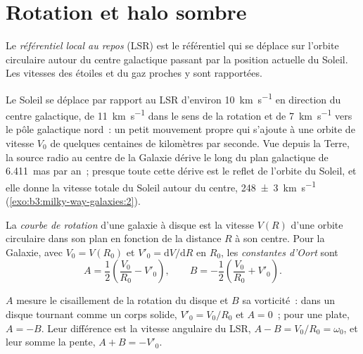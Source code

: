 \section{Rotation et halo sombre}\label{sec:b3:milky-way-galaxies:rotation}

\begin{definition}\label{def:b3:milky-way-galaxies:lsr}
Le \emph{référentiel local au repos} (LSR) est
le référentiel qui se déplace sur l'orbite circulaire autour du centre galactique
passant par la position actuelle du Soleil. Les vitesses des étoiles et du gaz
proches y sont rapportées.
\end{definition}

Le Soleil se déplace par rapport au LSR d'environ \qty{10}{km.s^{-1}} en direction du
centre galactique, de \qty{11}{km.s^{-1}} dans le sens de la rotation et de
\qty{7}{km.s^{-1}} vers le pôle galactique nord~: un petit mouvement propre
qui s'ajoute à une orbite de vitesse $V_0$ de quelques centaines de kilomètres
par seconde. Vue depuis la Terre, la source radio au centre de la Galaxie dérive
le long du plan galactique de \qty{6.411}{mas} par an~; presque toute cette
dérive est le reflet de l'orbite du Soleil, et elle donne la vitesse totale du
Soleil autour du centre, \qty[separate-uncertainty=true]{248 \pm 3}{km.s^{-1}}
(\cref{exo:b3:milky-way-galaxies:2}).

\begin{definition}\label{def:b3:milky-way-galaxies:rotation-curve}
La \emph{courbe de rotation} d'une galaxie à disque est la
vitesse $V(R)$ d'une orbite circulaire dans son plan en fonction de la
distance $R$ à son centre. Pour la Galaxie, avec $V_0 = V(R_0)$ et
$V'_0 = \mathrm{d}V/\mathrm{d}R$ en $R_0$, les \emph{constantes
d'Oort} sont
\[
A = \frac12\left(\frac{V_0}{R_0} - V'_0\right), \qquad
B = -\frac12\left(\frac{V_0}{R_0} + V'_0\right).
\]
\end{definition}

$A$ mesure le cisaillement de la rotation du disque et $B$ sa vorticité~: dans un
disque tournant comme un corps solide, $V'_0 = V_0/R_0$ et $A = 0$~; pour une  plate, $A = -B$. Leur différence est la vitesse angulaire du LSR,
$A - B = V_0/R_0 = \omega_0$, et leur somme la pente, $A + B = -V'_0$.

